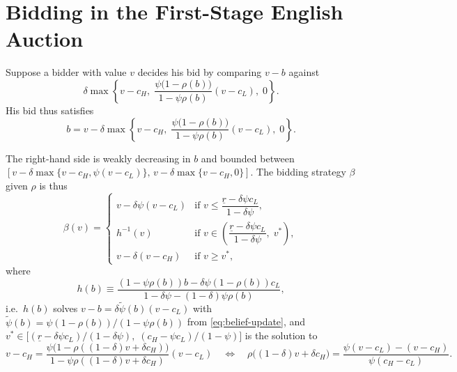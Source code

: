 \section{Bidding in the First-Stage English Auction}
\label{sec:bidding}

Suppose a bidder with value $v$ decides his bid by comparing $v - b$ against
\begin{equation}
  \delta \max\left\{
    v - c_H,\;
    \frac{\psi\bigl(1 - \rho(b)\bigr)}{1 - \psi \rho(b)}(v - c_L),\;
    0
  \right\}.
  \label{eq:bid-compare}
\end{equation}
His bid thus satisfies
\begin{equation}
  b
  = v - \delta \max\left\{
    v - c_H,\;
    \frac{\psi\bigl(1 - \rho(b)\bigr)}{1 - \psi \rho(b)}(v - c_L),\;
    0
  \right\}.
  \label{eq:bid-implicit}
\end{equation}

The right-hand side is weakly decreasing in $b$ and bounded between
$[v - \delta \max\{v - c_H, \psi(v - c_L)\},\, v - \delta \max\{v - c_H, 0\}]$.
The bidding strategy $\beta$ given $\rho$ is thus
\begin{equation}
  \beta(v)
  = \begin{cases}
      v - \delta \psi (v - c_L)
        & \text{if }
        v \le \dfrac{\underline{r} - \delta \psi c_L}{1 - \delta \psi}, \\[0.6em]
      h^{-1}(v)
        & \text{if }
        v \in \left(
          \dfrac{\underline{r} - \delta \psi c_L}{1 - \delta \psi},\;
          v^{*}
        \right), \\[0.6em]
      v - \delta(v - c_H)
        & \text{if } v \ge v^{*},
    \end{cases}
  \label{eq:beta-piecewise}
\end{equation}
where
\begin{equation}
  h(b)
  \equiv \frac{
    (1 - \psi \rho(b)) b - \delta \psi (1 - \rho(b)) c_L
  }{
    1 - \delta \psi - (1 - \delta)\psi \rho(b)
  },
  \label{eq:h-def}
\end{equation}
i.e.\ $h(b)$ solves $v-b=\delta\tilde{\psi}(b)(v-c_L)$ with
$\tilde{\psi}(b)=\psi(1-\rho(b))/(1-\psi\rho(b))$ from \eqref{eq:belief-update}, and
$v^{*} \in
\bigl[
  (\underline{r} - \delta \psi c_L)/(1 - \delta \psi),\;
  (c_H - \psi c_L)/(1 - \psi)
\bigr]$
is the solution to
\begin{equation}
  v - c_H
  = \frac{
      \psi\bigl(1 - \rho((1 - \delta)v + \delta c_H)\bigr)
    }{
      1 - \psi \rho((1 - \delta)v + \delta c_H)
    }
    (v - c_L)
  \quad\Longleftrightarrow\quad
  \rho\bigl((1 - \delta)v + \delta c_H\bigr)
  = \frac{\psi(v - c_L) - (v - c_H)}{\psi(c_H - c_L)}.
  \label{eq:v-star}
\end{equation}
